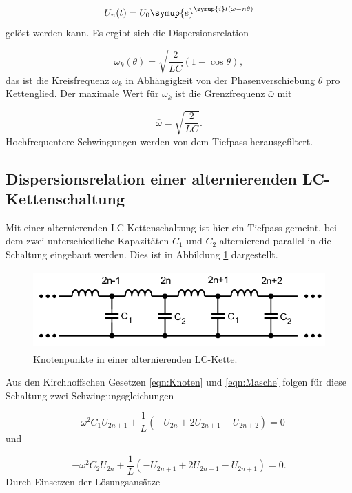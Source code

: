 \begin{equation}
  U_{n}(t) = U_0 \symup{e}^{\symup{i}t (\omega - n \theta)}
\end{equation}
gelöst werden kann.
Es ergibt sich die Dispersionsrelation

\begin{equation}
  \omega_k(\theta) = \sqrt{\frac{2}{LC}(1-\cos\theta)},
  \label{eqn:Dispersion}
\end{equation}
das ist die Kreisfrequenz
$\omega_k$ in Abhängigkeit von der Phasenverschiebung $\theta$ pro Kettenglied.
Der maximale Wert für $\omega_k$ ist die Grenzfrequenz $\bar{\omega}$
mit

\begin{equation}
  \bar{\omega} = \sqrt{\frac{2}{LC}}.
\end{equation}
Hochfrequentere Schwingungen werden von dem Tiefpass herausgefiltert.


\subsection{Dispersionsrelation einer alternierenden LC-Kettenschaltung}

Mit einer alternierenden LC-Kettenschaltung ist hier ein Tiefpass gemeint,
bei dem zwei unterschiedliche Kapazitäten $C_1$ und $C_2$ alternierend
parallel in die Schaltung eingebaut werden. Dies ist in Abbildung
\ref{fig:KetteLC1C2} dargestellt.

\newpage

\begin{figure}
  \centering
  \includegraphics[height=3cm]{KetteLC1C2.png}
  \caption{Knotenpunkte in einer alternierenden LC-Kette.}
  \label{fig:KetteLC1C2}
\end{figure}

Aus den Kirchhoffschen Gesetzen \eqref{eqn:Knoten} und \eqref{eqn:Masche}
folgen für diese Schaltung zwei Schwingungsgleichungen

\begin{equation}
  -\omega^2 C_1 U_{2n+1} + \frac{1}{L}(-U_{2n}+2U_{2n+1}-U_{2n+2}) = 0
\end{equation}
und

\begin{equation}
  -\omega^2 C_2 U_{2n} + \frac{1}{L}(-U_{2n+1}+2U_{2n+1}-U_{2n+1}) = 0.
\end{equation}
Durch Einsetzen der Lösungsansätze

